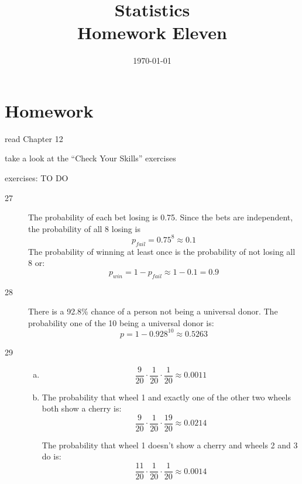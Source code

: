 \documentclass[letterpaper, landscape]{exam}
\title{Statistics \\ Homework Eleven}
\date{\today}
\author{}
\begin{document}
  \maketitle

  \section{Homework}
  \ifprintanswers
  \else
    \begin{itemize*}
      \item read Chapter 12 
      \item take a look at the ``Check Your Skills'' exercises
      \item exercises: TO DO
    \end{itemize*}
  \fi

  \ifprintanswers
    \begin{description}

      \item[27] 
        The probability of each bet losing is 0.75. Since the bets are
        independent, the probability of all 8 losing is
        \[
          p_{fail} = 0.75^8 \approx 0.1
        \]
        The probability of winning at least once is the probability of not
        losing all 8 or:
        \[
          p_{win} = 1 - p_{fail} \approx 1 - 0.1 = \boxed{ 0.9 } 
        \]

      \item[28]
        There is a 92.8\% chance of a person not being a universal donor. The
        probability one of the 10 being a universal donor is:
        \[
          p = 1 - 0.928^{10} \approx \boxed{ 0.5263 }
        \]

      \item[29]
        \begin{enumerate}[(a)]
          \item 
            \[
              \frac{9}{20} \cdot \frac{1}{20} \cdot \frac{1}{20} 
                \approx \boxed{ 0.0011 }
            \]

          \item
              The probability that wheel 1 and exactly one of the other two
              wheels both show a cherry is:
              \[
                \frac{9}{20} \cdot \frac{1}{20} \cdot \frac{19}{20} 
                  \approx \boxed{ 0.0214 }
              \]

              The probability that wheel 1 doesn't show a cherry and wheels 2 and 3 
              do is:
              \[
                \frac{11}{20} \cdot \frac{1}{20} \cdot \frac{1}{20} 
                  \approx \boxed{ 0.0014 }
              \]


\end{enumerate}
\end{description}
\end{document}
